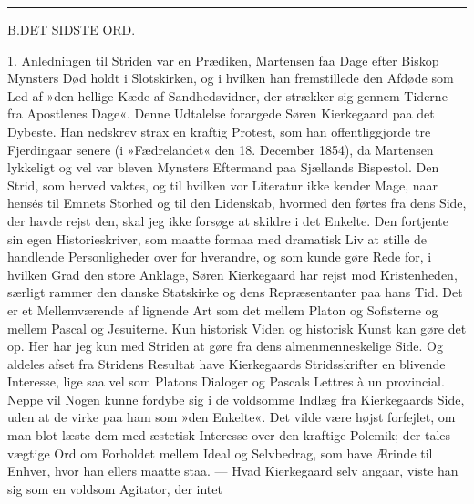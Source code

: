 \documentclass[12pt,a4paper,openany]{book}
\newcommand{\opage}[1]{\marginnote{\footnotesize\textit{[#1]}}}
\begin{document}
\begin{center}\rule{3cm}{0.4pt}\end{center}

\begin{center}B.\enspace DET SIDSTE ORD.\end{center}

1. Anledningen til Striden var en Prædiken, Martensen
faa Dage efter Biskop Mynsters Død holdt i Slotskirken,
og i hvilken han fremstillede den Afdøde som
Led af »den hellige Kæde af Sandhedsvidner, der strækker
sig gennem Tiderne fra Apostlenes Dage«. Denne Udtalelse
forargede Søren Kierkegaard paa det Dybeste. Han nedskrev
strax en kraftig Protest, som han offentliggjorde
tre Fjerdingaar senere (i »Fædrelandet« den 18. December
1854), da Martensen lykkeligt og vel var bleven Mynsters
Eftermand paa Sjællands Bispestol. Den Strid, som herved
vaktes, og til hvilken vor Literatur ikke kender Mage,
naar hensés til Emnets Storhed og til den Lidenskab,
hvormed den førtes fra dens Side, der havde rejst den,
skal jeg ikke forsøge at skildre i det Enkelte. Den fortjente
sin egen Historieskriver, som maatte formaa med
dramatisk Liv at stille de handlende Personligheder over
for hverandre, og som kunde gøre Rede for, i hvilken Grad
den store Anklage, Søren Kierkegaard har rejst mod
Kristenheden, særligt rammer den danske Statskirke og
dens Repræsentanter paa hans Tid. Det er et Mellemværende
af lignende Art som det mellem Platon og Sofisterne
og mellem Pascal og Jesuiterne. Kun historisk
Viden og historisk Kunst kan gøre det op. Her har jeg
kun med Striden at gøre fra dens almenmenneskelige Side.
Og aldeles afset fra Stridens Resultat have Kierkegaards
\opage{144}Stridsskrifter en blivende Interesse, lige saa vel som
Platons Dialoger og Pascals Lettres à un provincial.
Neppe vil Nogen kunne fordybe sig i de voldsomme Indlæg
fra Kierkegaards Side, uden at de virke paa ham
som »den Enkelte«. Det vilde være højst forfejlet, om
man blot læste dem med æstetisk Interesse over den
kraftige Polemik; der tales vægtige Ord om Forholdet
mellem Ideal og Selvbedrag, som have Ærinde til Enhver,
hvor han ellers maatte staa. --- Hvad Kierkegaard selv
angaar, viste han sig som en voldsom Agitator, der intet
\end{document}
